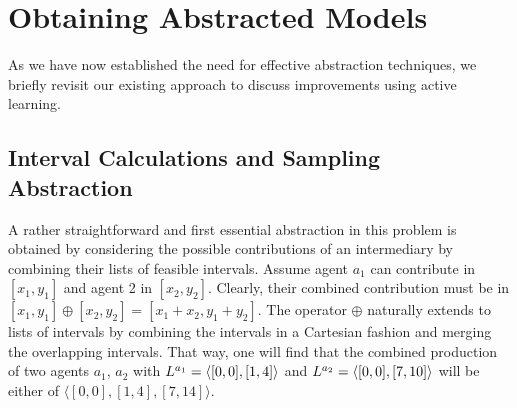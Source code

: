\documentclass[conference]{IEEEtran}
\begin{document}


\section{Obtaining Abstracted Models}
As we have now established the need for effective abstraction
techniques, we briefly revisit our existing approach to 
discuss improvements using active learning.

\subsection{Interval Calculations and Sampling Abstraction}
A rather straightforward and first essential abstraction in this problem is 
obtained by considering the possible contributions of an intermediary
by combining their lists of feasible intervals. Assume agent $a_1$ can contribute
in $[x_1, y_1]$ and agent 2 in $[x_2, y_2]$. Clearly, their combined contribution
must be in $[x_1, y_1] \oplus [x_2, y_2] = [x_1 + x_2, y_1 + y_2]$. The operator $\oplus$
naturally extends to lists of intervals by combining the intervals in a Cartesian fashion
and merging the overlapping intervals. That way, one will find that the combined production
of two agents $a_1$, $a_2$ with $L^{a_1} = \langle [0,0], [1,4] \rangle$ and
$L^{a_2} = \langle [0,0], [7,10] \rangle$ will be either of $\langle [0,0], 
[1,4], [7, 14] \rangle$.
\end{document}
